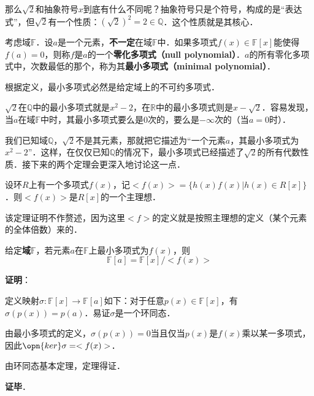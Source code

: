那么$\sqrt{2}$和抽象符号$x$到底有什么不同呢？抽象符号只是个符号，构成的是“表达式”，但$\sqrt{2}$有一个性质：$(\sqrt{2})^2=2\in\mathbb{Q}$．这个性质就是其核心．

\begin{definition}{}
考虑域$\mathbb{F}$．设$a$是一个元素，\textbf{不一定}在域$\mathbb{F}$中．如果多项式$f(x)\in\mathbb{F}[x]$能使得$f(a)=0$，则称$f$是$a$的一个\textbf{零化多项式（null polynomial）}．$a$的所有零化多项式中，次数最低的那个，称为其\textbf{最小多项式（minimal polynomial）}．
\end{definition}

根据定义，最小多项式必然是给定域上的不可约多项式．



$\sqrt{2}$在$\mathbb{Q}$中的最小多项式就是$x^2-2$，在$\mathbb{R}$中的最小多项式则是$x-\sqrt{2}$．容易发现，当$a$在域$\mathbb{F}$中时，其最小多项式要么是$0$次的，要么是$-\infty$次的（当$a=0$时）．

我们已知域$\mathbb{Q}$，$\sqrt{2}$不是其元素，那就把它描述为“一个元素$a$，其最小多项式为$x^2-2$”．这样，在仅仅已知$\mathbb{Q}$的情况下，最小多项式已经描述了$\sqrt{2}$的所有代数性质．接下来的两个定理会更深入地讨论这一点．



\begin{theorem}{}%

设环$R$上有一个多项式$f(x)$，记$<f(x)>=\{h(x)f(x)|h(x)\in R[x]\}$．则$<f(x)>$是$R[x]$的一个主理想．

\end{theorem}

该定理证明不作赘述，因为这里$<f>$的定义就是按照主理想的定义（某个元素的全体倍数）来的．





\begin{theorem}{}\label{RPlynm_the2}%

给定\textbf{域}$\mathbb{F}$，若元素$a$在$\mathbb{F}$上最小多项式为$f(x)$，则
\begin{equation}
\mathbb{F}[a]=\mathbb{F}[x]/<f(x)>    
\end{equation}

\end{theorem}



\textbf{证明}：

定义映射$\sigma:\mathbb{F}[x]\to\mathbb{F}[a]$如下：对于任意$p(x)\in\mathbb{F}[x]$，有$\sigma(p(x))=p(a)$．易证$\sigma$是一个环同态．

由最小多项式的定义，$\sigma(p(x))=0$当且仅当$p(x)$是$f(x)$乘以某一多项式，因此$\opn{ker}\sigma = <f(x)>$．

由环同态基本定理，定理得证．

\textbf{证毕}．














